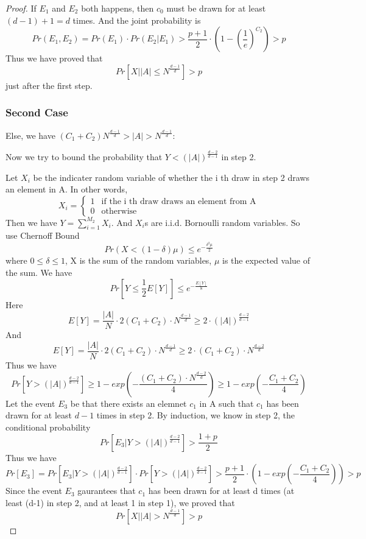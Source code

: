 \documentclass{article}
\begin{document}
\begin{spacing}{1.1}
\begin{proof}
    If $E_1$ and $E_2$ both happens, then $c_0$ must be drawn for at least $(d-1) + 1 = d$ times. And the joint probability is
    \begin{equation}
        Pr(E_1, E_2) = Pr(E_1)\cdot Pr(E_2 | E_1) > \frac{p+1}{2} \cdot (1 - (\frac{1}{e})^{C_2}) > p
    \end{equation}
    Thus we have proved that $$Pr[X | |A| \leq N^{\frac{d-1}{d}}] > p$$ just after the first step.
    \subsubsection{Second Case}
    Else, we have $(C_1 + C_2)N^{\frac{d-1}{d}} > |A| > N^{\frac{d-1}{d}}$:

    Now we try to bound the probability that $Y < (|A|)^{\frac{d-2}{d-1}}$ in step 2.

    Let $X_i$ be the indicater random variable of whether the i th draw in step 2 draws an element in A. In other words,
    \begin{equation}
        X_i = \begin{cases}
            1 & \text{if the i th draw draws an element from A} \\
            0 & \text{otherwise}
        \end{cases}
    \end{equation}
    Then we have $Y = \sum_{i=1}^{M_2}X_i$. And $X_i$s are i.i.d. Bornoulli random variables. So use Chernoff Bound
    $$ Pr(X < (1 - \delta)\mu) \leq e^{-\frac{\delta^2 \mu}{2}}$$
    where $0\leq \delta \leq 1$, X is the sum of the random variables, $\mu$ is the expected value of the sum.
    We have
    \begin{equation}
        Pr[Y \leq \frac{1}{2}E[Y]] \leq e^{-\frac{E[Y]}{8}}
    \end{equation}
    Here 
    $$E[Y] = \frac{|A|}{N} \cdot 2(C_1 + C_2)\cdot N^{\frac{d-1}{d}} \geq 2\cdot (|A|)^{\frac{d-2}{d-1}}$$
    And
    $$E[Y] = \frac{|A|}{N} \cdot 2(C_1 + C_2)\cdot N^{\frac{d-1}{d}} \geq 2\cdot (C_1 + C_2)\cdot N^{\frac{d-2}{d}}$$
    Thus we have
    $$Pr[Y > (|A|)^{\frac{d-2}{d-1}}] \geq 1 - exp(-\frac{(C_1 + C_2)\cdot N^{\frac{d-2}{d}}}{4}) \geq 1 - exp(-\frac{C_1 + C_2}{4})$$
    Let the event $E_3$ be that there exists an elemnet $c_1$ in A such that $c_1$ has been drawn for at least $d-1$ times in step 2. By induction, we know in step 2, the conditional probability
    $$Pr[E_3 | Y > (|A|)^{\frac{d-2}{d-1}}] > \frac{1+p}{2}$$
    Thus we have
    \begin{equation}
        Pr[E_3] = Pr[E_3 | Y > (|A|)^{\frac{d-2}{d-1}}]\cdot Pr[Y > (|A|)^{\frac{d-2}{d-1}}] > \frac{p+1}{2}\cdot (1 - exp(-\frac{C_1 + C_2}{4})) > p
    \end{equation}
    Since the event $E_3$ gaurantees that $c_1$ has been drawn for at least d times (at least (d-1) in step 2, and at least 1 in step 1), we proved that
    $$Pr[X | |A| > N^{\frac{d-1}{d}}] > p$$


\end{proof}
\end{spacing}
\end{document}

